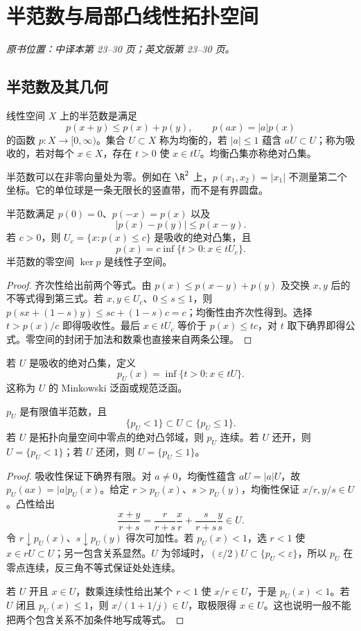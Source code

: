 \section{半范数与局部凸线性拓扑空间}\label{sec:yosida-01-01}
\noindent\textit{原书位置：中译本第 23--30 页；英文版第 23--30 页。}

\subsection{半范数及其几何}
\begin{definition}
线性空间 $X$ 上的半范数是满足
\[
 p(x+y)\le p(x)+p(y),\qquad p(ax)=|a|p(x)
\]
的函数 $p:X\to[0,\infty)$。集合 $U\subset X$ 称为均衡的，若 $|a|\le1$ 蕴含 $aU\subset U$；称为吸收的，若对每个 $x\in X$，存在 $t>0$ 使 $x\in tU$。均衡凸集亦称绝对凸集。
\end{definition}
半范数可以在非零向量处为零。例如在 $\R^2$ 上，$p(x_1,x_2)=|x_1|$ 不测量第二个坐标。它的单位球是一条无限长的竖直带，而不是有界圆盘。

\begin{proposition}[基本不等式与半范数球]\label{prop:y1-seminorm-basic}
半范数满足 $p(0)=0$、$p(-x)=p(x)$ 以及
\[
 |p(x)-p(y)|\le p(x-y).
\]
若 $c>0$，则 $U_c=\{x:p(x)\le c\}$ 是吸收的绝对凸集，且
\[
 p(x)=c\inf\{t>0:x\in tU_c\}.
\]
半范数的零空间 $\ker p$ 是线性子空间。
\end{proposition}
\begin{proof}
齐次性给出前两个等式。由 $p(x)\le p(x-y)+p(y)$ 及交换 $x,y$ 后的不等式得到第三式。若 $x,y\in U_c$、$0\le s\le1$，则 $p(sx+(1-s)y)\le sc+(1-s)c=c$；均衡性由齐次性得到。选择 $t>p(x)/c$ 即得吸收性。最后 $x\in tU_c$ 等价于 $p(x)\le tc$，对 $t$ 取下确界即得公式。零空间的封闭于加法和数乘也直接来自两条公理。
\end{proof}

\begin{definition}[Minkowski 泛函]
若 $U$ 是吸收的绝对凸集，定义
\[
 p_U(x)=\inf\{t>0:x\in tU\}.
\]
这称为 $U$ 的 Minkowski 泛函或规范泛函。
\end{definition}
\begin{theorem}\label{thm:y1-gauge}
$p_U$ 是有限值半范数，且
\[
 \{p_U<1\}\subset U\subset\{p_U\le1\}.
\]
若 $U$ 是拓扑向量空间中零点的绝对凸邻域，则 $p_U$ 连续。若 $U$ 还开，则 $U=\{p_U<1\}$；若 $U$ 还闭，则 $U=\{p_U\le1\}$。
\end{theorem}
\begin{proof}
吸收性保证下确界有限。对 $a\ne0$，均衡性蕴含 $aU=|a|U$，故 $p_U(ax)=|a|p_U(x)$。给定 $r>p_U(x)$、$s>p_U(y)$，均衡性保证 $x/r,y/s\in U$。凸性给出
\[
 \frac{x+y}{r+s}=\frac r{r+s}\frac xr+\frac s{r+s}\frac ys\in U.
\]
令 $r\downarrow p_U(x)$、$s\downarrow p_U(y)$ 得次可加性。若 $p_U(x)<1$，选 $r<1$ 使 $x\in rU\subset U$；另一包含关系显然。$U$ 为邻域时，$(\varepsilon/2)U\subset\{p_U<\varepsilon\}$，所以 $p_U$ 在零点连续，反三角不等式保证处处连续。

若 $U$ 开且 $x\in U$，数乘连续性给出某个 $r<1$ 使 $x/r\in U$，于是 $p_U(x)<1$。若 $U$ 闭且 $p_U(x)\le1$，则 $x/(1+1/j)\in U$，取极限得 $x\in U$。这也说明一般不能把两个包含关系不加条件地写成等式。
\end{proof}

